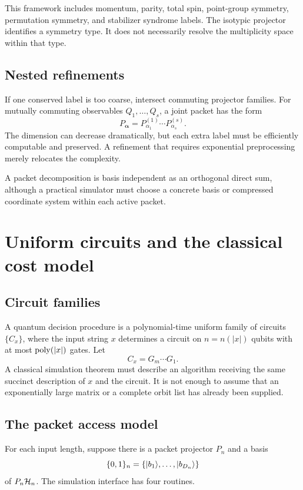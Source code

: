 This framework includes momentum, parity, total spin, point-group symmetry, permutation symmetry, and stabilizer syndrome labels. The isotypic projector identifies a symmetry type. It does not necessarily resolve the multiplicity space within that type.

\subsection{Nested refinements}
If one conserved label is too coarse, intersect commuting projector families. For mutually commuting observables $Q_1,\ldots,Q_s$, a joint packet has the form
\[
P_{\bm\alpha}
=
P^{(1)}_{\alpha_1}\cdots P^{(s)}_{\alpha_s}.
\]
The dimension can decrease dramatically, but each extra label must be efficiently computable and preserved. A refinement that requires exponential preprocessing merely relocates the complexity.

\begin{remark}
A packet decomposition is basis independent as an orthogonal direct sum, although a practical simulator must choose a concrete basis or compressed coordinate system within each active packet.
\end{remark}

\section{Uniform circuits and the classical cost model}
\label{s:ch:complexity-model}

\subsection{Circuit families}
A quantum decision procedure is a polynomial-time uniform family of circuits $\{C_x\}$, where the input string $x$ determines a circuit on $n=n(|x|)$ qubits with at most $\operatorname{poly}(|x|)$ gates. Let
\[
C_x=G_m\cdots G_1.
\]
A classical simulation theorem must describe an algorithm receiving the same succinct description of $x$ and the circuit. It is not enough to assume that an exponentially large matrix or a complete orbit list has already been supplied.

\subsection{The packet access model}
For each input length, suppose there is a packet projector $P_n$ and a basis
\[
\{0,1\}_n=
\{\lvert b_1\rangle,\ldots,\lvert b_{D_n}\rangle\}
\]
of $P_n\mathcal H_n$. The simulation interface has four routines.

